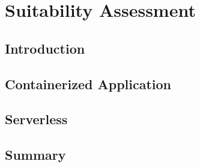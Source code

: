 \chapter{Suitability Assessment}


\section{Introduction}


\section{Containerized Application}


\section{Serverless}


\section{Summary}
